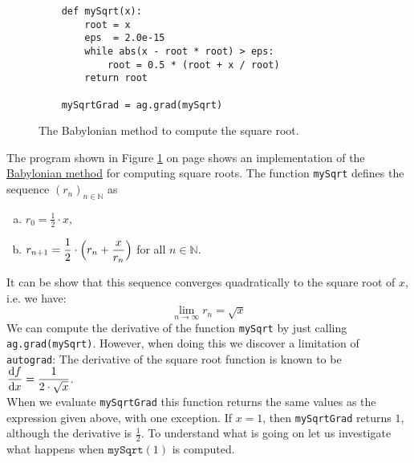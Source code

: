 \begin{figure}[!ht]
\centering
\begin{verbatim}
    def mySqrt(x): 
        root = x
        eps  = 2.0e-15
        while abs(x - root * root) > eps:
            root = 0.5 * (root + x / root)    
        return root

    mySqrtGrad = ag.grad(mySqrt)
\end{verbatim}
\vspace*{-0.3cm}
\caption{The Babylonian method to compute the square root.}
\label{fig:autograd-intro-2.ipynb}
\end{figure}
\noindent
The program shown in Figure \ref{fig:autograd-intro-2.ipynb} on page \pageref{fig:autograd-intro-2.ipynb} shows
an implementation of the
\href{https://en.wikipedia.org/wiki/Methods_of_computing_square_roots#Heron's_method}{Babylonian method} 
for computing square roots.  The function \texttt{mySqrt} defines the sequence $(r_n)_{n\in\mathbb{N}}$ as
\begin{enumerate}[(a)]
\item $\displaystyle r_0 = \frac{ 1}{2} \cdot x$,
\item $\displaystyle r_{n+1} = \frac{1}{2} \cdot \Bigl(r_n + \frac{x}{r_n}\Bigr)$ \quad for all $n \in \mathbb{N}$.
\end{enumerate}
It can be show that this sequence converges quadratically to the square root of $x$, i.e. we have:
$$ \lim\limits_{n\rightarrow\infty} r_n = \sqrt{x} $$
We can compute the derivative of the function \texttt{mySqrt} by just calling \texttt{ag.grad(mySqrt)}.
However, when doing this we discover a limitation of \texttt{autograd}: The derivative of the square root function is
known to be
\\[0.2cm]
\hspace*{1.3cm}
$ \displaystyle \frac{\mathrm{d} f}{\mathrm{d} x} = \frac{1}{2 \cdot \sqrt{x}}$.
\\[0.2cm]
When we evaluate \texttt{mySqrtGrad} this function returns the same values as the expression given above, with
one exception.  If $x = 1$, then \texttt{mySqrtGrad} returns $1$, although the derivative is $\frac{1}{2}$.
To understand what is going on let us investigate what happens when $\texttt{mySqrt}(1)$ is computed.
